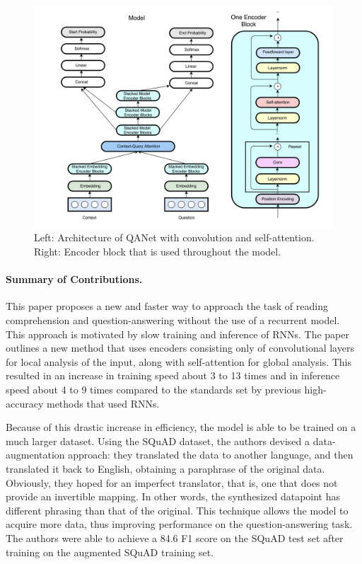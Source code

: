 \documentclass{article}
\begin{document}
\begin{figure}[h]
\centering
\includegraphics[scale=0.23]{model_diagram}
\caption{Left: Architecture of QANet with convolution and self-attention. Right: Encoder block that is used throughout the model.}
\end{figure}

\paragraph{Summary of Contributions.}
This paper proposes a new and faster way to approach the task of reading comprehension and question-answering without the use of a recurrent model. This approach is motivated by slow training and inference of RNNs. The paper outlines a new method that uses encoders consisting only of convolutional layers for local analysis of the input, along with self-attention for global analysis. This resulted in an increase in training speed about 3 to 13 times and in inference speed about 4 to 9 times compared to the standards set by previous high-accuracy methods that used RNNs.

Because of this drastic increase in efficiency, the model is able to be trained on a much larger dataset. Using the SQuAD dataset, the authors devised a data-augmentation approach: they translated the data to another language, and then translated it back to English, obtaining a paraphrase of the original data. Obviously, they hoped for an imperfect translator, that is, one that does not provide an invertible mapping. In other words, the synthesized datapoint has different phrasing than that of the original. This technique allows the model to acquire more data, thus improving performance on the question-answering task. The authors were able to achieve a 84.6 F1 score on the SQuAD test set after training on the augmented SQuAD training set.
\end{document}
